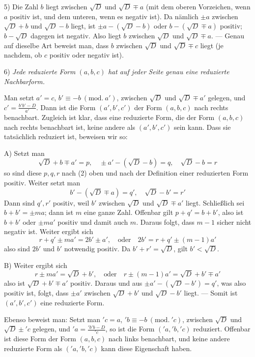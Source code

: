 5) Die Zahl $b$ liegt zwischen $\surd D$ und $\surd D\mp a$ (mit dem oberen Vorzeichen, wenn $a$ positiv ist, und dem unteren, wenn es negativ ist). Da nämlich $\pm a$ zwischen $\surd D+b$ und $\surd D-b$ liegt, ist $\pm a-(\surd D-b)$ oder $b-(\surd D\mp a)$ positiv; $b-\surd D$ dagegen ist negativ. Also liegt $b$ zwischen $\surd D$ und $\surd D\mp a$. --- Genau auf dieselbe Art beweist man, dass $b$ zwischen $\surd D$ und $\surd D\mp c$ liegt (je nachdem, ob $c$ positiv oder negativ ist).

6) \textit{Jede reduzierte Form $(a,b,c)$ hat auf jeder Seite genau eine reduzierte Nachbarform.}

Man setzt $a'=c$, $b'\equiv-b\ (\mathrm{mod.}\ a')$, zwischen $\surd D$ und $\surd D\mp a'$ gelegen, und $c'=\frac{b'b'-D}{a'}$. Dann ist die Form $(a',b',c')$ der Form $(a,b,c)$ nach rechts benachbart. Zugleich ist klar, dass eine reduzierte Form, die der Form $(a,b,c)$ nach rechts benachbart ist, keine andere als $(a',b',c')$ sein kann. Dass sie tatsächlich reduziert ist, beweisen wir so:

A) Setzt man
\[
\surd D+b\mp a'=p,\quad\pm a'-(\surd D-b)=q,\quad\surd D-b=r
\]
so sind diese $p,q,r$ nach (2) oben und nach der Definition einer reduzierten Form positiv. Weiter setzt man
\[
b'-(\surd D\mp a)=q',\quad\surd D-b'=r'
\]
Dann sind $q',r'$ positiv, weil $b'$ zwischen $\surd D$ und $\surd D\mp a'$ liegt. Schließlich sei $b+b'=\pm ma$; dann ist $m$ eine ganze Zahl. Offenbar gilt $p+q'=b+b'$, also ist $b+b'$ oder $\pm ma'$ positiv und damit auch $m$. Daraus folgt, dass $m-1$ sicher nicht negativ ist. Weiter ergibt sich
\[
r+q'\pm ma'=2b'\pm a',\quad\text{oder}\quad2b'=r+q'\pm(m-1)a'
\]
also sind $2b'$ und $b'$ notwendig positiv. Da $b'+r'=\surd D$, gilt $b'<\surd D$.

B) Weiter ergibt sich
\[
r\pm ma'=\surd D+b',\quad\text{oder}\quad r\pm(m-1)a'=\surd D+b'\mp a'
\]
also ist $\surd D+b'\mp a'$ positiv. Daraus und aus $\pm a'-(\surd D-b')=q'$,
was also positiv ist, folgt, dass $\pm a'$ zwischen $\surd D+b'$ und $\surd D-b'$ liegt. --- Somit ist $(a',b',c')$ eine reduzierte Form.

Ebenso beweist man: Setzt man ${}'c=a$, ${}'b\equiv-b\ (\mathrm{mod.}\ {}'c)$, zwischen $\surd D$ und $\surd D\pm{}'c$ gelegen, und ${}'a=\frac{{}'b{}'b-D}{{}'c}$, so ist die Form $({}'a,{}'b,{}'c)$ reduziert. Offenbar ist diese Form der Form $(a,b,c)$ nach links benachbart, und keine andere reduzierte Form als $({}'a,{}'b,{}'c)$ kann diese Eigenschaft haben.

